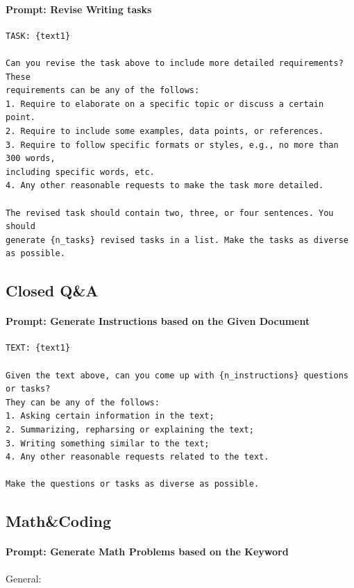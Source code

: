 \documentclass[11pt]{article}
\begin{document}
\paragraph{Prompt: Revise Writing tasks}
\begin{verbatim}
TASK: {text1}

Can you revise the task above to include more detailed requirements? These 
requirements can be any of the follows:
1. Require to elaborate on a specific topic or discuss a certain point.
2. Require to include some examples, data points, or references.
3. Require to follow specific formats or styles, e.g., no more than 300 words, 
including specific words, etc.
4. Any other reasonable requests to make the task more detailed.

The revised task should contain two, three, or four sentences. You should 
generate {n_tasks} revised tasks in a list. Make the tasks as diverse as possible.
\end{verbatim}



\subsection{Closed Q\&A}


\paragraph{Prompt: Generate Instructions based on the Given Document}
\begin{verbatim}
TEXT: {text1}

Given the text above, can you come up with {n_instructions} questions or tasks? 
They can be any of the follows:
1. Asking certain information in the text;
2. Summarizing, repharsing or explaining the text;
3. Writing something similar to the text;
4. Any other reasonable requests related to the text.

Make the questions or tasks as diverse as possible.
\end{verbatim}


\subsection{Math\&Coding}
\paragraph{Prompt: Generate Math Problems based on the Keyword}
General:
\end{document}
